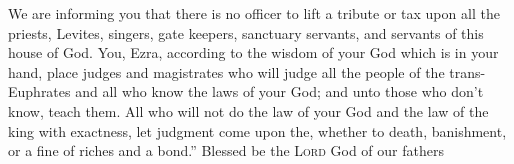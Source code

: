 \begin{inparaenum}
     We are informing you that there is no officer to lift a tribute or tax upon all the priests, Levites, singers, gate keepers, sanctuary servants, and servants of this house of God.%
     You, Ezra, according to the wisdom of your God which is in your hand, place judges and magistrates who will judge all the people of the trans-Euphrates and all who know the laws of your God; and unto those who don't know, teach them.%
     All who will not do the law of your God and the law of the king with exactness, let judgment come upon the, whether to death, banishment, or a fine of riches and a bond.''%
     Blessed be the \textsc{Lord} God of our fathers%
\end{inparaenum}

